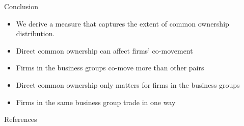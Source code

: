 \documentclass{beamer}
\begin{document}
	\begin{frame}{Conclusion}
		\begin{itemize}
			
			\item We derive a measure that captures the extent of common ownership distribution.
			
			
			\item Direct common ownership can affect firms' co-movement
			\item 
			Firms in the business groups co-move more than other pairs
			\item Direct common ownership only matters for firms in the business groups
			\item Firms in the same business group trade in one way
			
		\end{itemize}
	\end{frame}
	
	\tiny
	\begin{frame}[allowframebreaks]{References}
		
		{		
			
			
		}
	\end{frame}
	
	\normalsize
	
	
	\color{black}
	\appendix
	
	
	
	
	
	
\end{document}
